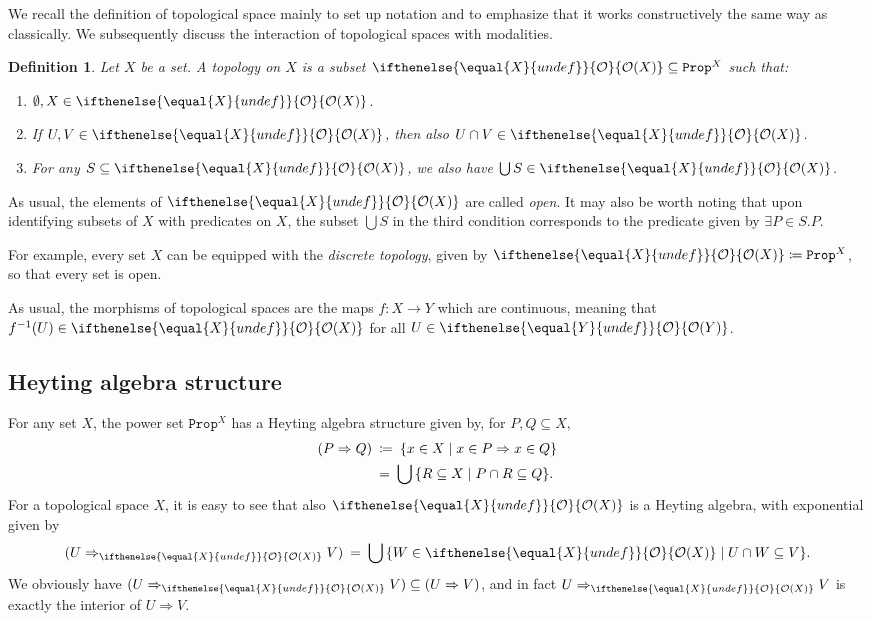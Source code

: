 \documentclass[reqno,11pt]{amsproc}
\newcommand{\tob}[1]{\todo[color=blue!40,inline]{\tn{\textbf{T:} #1}}\noindent}
\theoremstyle{plain}
\newtheorem{definition}[theorem]{Definition}
\theoremstyle{definition}
\newcommand{\Const}[1]{\mathtt{#1}}
\renewcommand{\to}[1][]{\xrightarrow{#1}}
\newcommand{\tn}[1]{\textnormal{#1}}
\newcommand{\prop}{\Const{Prop}}
\newcommand{\Op}[1][undef]{\ifthenelse{\equal{#1}{undef}}{\mathcal{O}}{\mathcal{O}(#1)}}
\newcommand{\imp}{\Rightarrow}
\let\originalleft\left
\let\originalright\right
\renewcommand{\left}{\mathopen{}\mathclose\bgroup\originalleft}
\renewcommand{\right}{\aftergroup\egroup\originalright}
\numberwithin{equation}{section}
\begin{document}
We recall the definition of topological space mainly to set up notation and to emphasize that it works constructively the same way as classically. We subsequently discuss the interaction of topological spaces with modalities.

\begin{definition}\label{def.internal_space}
	Let $X$ be a set. A \emph{topology} on $X$ is a subset $\Op[X] \subseteq \prop^X$ such that:
	\begin{enumerate}
		\item $\emptyset, X \in \Op[X]$.
		\item If $U,V \in \Op[X]$, then also $U \cap V \in \Op[X]$.
		\item For any $S \subseteq \Op[X]$, we also have $\bigcup S \in \Op[X]$.
	\end{enumerate}
\end{definition}

As usual, the elements of $\Op[X]$ are called \emph{open}. It may also be worth noting that upon identifying subsets of $X$ with predicates on $X$, the subset $\bigcup S$ in the third condition corresponds to the predicate given by $\exists P \in S . P$.

For example, every set $X$ can be equipped with the \emph{discrete topology}, given by $\Op[X] \coloneqq \prop^X$, so that every set is open.

As usual, the morphisms of topological spaces are the maps $f \colon X \to Y$ which are continuous, meaning that $f^{-1}(U) \in \Op[X]$ for all $U \in \Op[Y]$.

\subsection{Heyting algebra structure}

For any set $X$, the power set $\prop^X$ has a Heyting algebra structure given by, for $P, Q \subseteq X$,
\begin{align*}
	(P \imp Q) \:	&	\coloneqq \: \{ x \in X \mid x \in P \imp x \in Q \}	\\
			&	= \: \bigcup \, \left\{ R \subseteq X \mid P \cap R \subseteq Q \right\}.
\end{align*}
For a topological space $X$, it is easy to see that also $\Op[X]$ is a Heyting algebra, with exponential given by
\[
	(U \imp_{\Op[X]} V) \: = \: \bigcup \, \left\{ W \in \Op[X] \mid U \cap W \subseteq V \right\}.
\]
We obviously have $(U \imp_{\Op[X]} V) \subseteq (U \imp V)$, and in fact $U \imp_{\Op[X]} V$ is exactly the interior of $U \imp V$.
\tob{Not sure if this is relevant}
\end{document}
